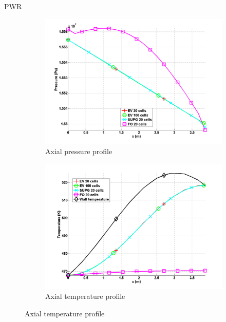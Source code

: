 \documentclass[xcolor=dvipsnames,10pt]{beamer}
\begin{document}
\begin{frame}{PWR}
\begin{figure}[H]
\begin{subfigure}[b]{0.37\textwidth}
\centering
\includegraphics[width=\textwidth]{../figures/PWR_stt_pressure.png}
\caption{Axial pressure profile}
\end{subfigure}
%
\begin{subfigure}[b]{0.37\textwidth}
\centering
\includegraphics[width=\textwidth]{../figures/PWR_stt_temperature.png}
\caption{Axial temperature profile}
\end{subfigure}


\end{figure}
\end{frame}
\end{document}
